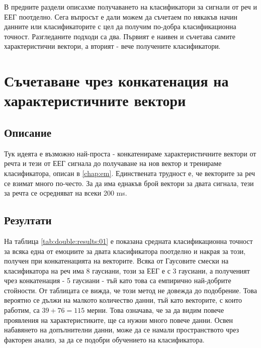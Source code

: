 \documentclass[main.tex]{subfiles}
\begin{document}
В предните раздели описахме получаването на класификатори за сигнали от реч и ЕЕГ поотделно. Сега въпросът е дали можем да съчетаем по някакъв начин данните или класификаторите с цел да получим по-добра класификационна точност. Разгледаните подходи са два. Първият е наивен и съчетава самите характеристични вектори, а вторият - вече получените класификатори.

\section{Съчетаване чрез конкатенация на характеристичните вектори}
\subsection{Описание}
Тук идеята е възможно най-проста - конкатенираме характеристичните вектори от речта и тези от ЕЕГ сигнала до получаване на нов вектор и тренираме класификатора, описан в \autoref{chap:em}. Единствената трудност е, че векторите за реч се взимат много по-често. За да има еднакъв брой вектори за двата сигнала, тези за речта се осредняват на всеки 200 ms.
\subsection{Резултати}
На таблица \autoref{tab:double:results:01} е показана средната класификационна точност за всяка една от емоциите за двата класификатора поотделно и накрая за този, получен при конкатенацията на векторите. Всяка от Гаусовите смески на класификатора на реч има 8 гаусиани, този за ЕЕГ е с 3 гаусиани, а полученият чрез конкатенация - 5 гаусиани - тъй като това са емпирично най-добрите стойности. От таблицата се вижда, че този метод не довежда до подобрение. Това вероятно се дължи на малкото количество данни, тъй като векторите, с които работим, са $39 + 76 = 115$ мерни. Това означава, че за да видим повече проявления на характеристиките, ще са нужни много повече данни. Освен набавянето на допълнителни данни, може да се намали пространството чрез факторен анализ, за да се подобри обучението на класификатора.
\end{document}
